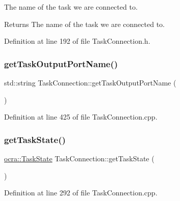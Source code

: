 The name of the task we are connected to.

\begin{DoxyReturn}{Returns}
The name of the task we are connected to. 
\end{DoxyReturn}


Definition at line 192 of file Task\+Connection.\+h.

\hypertarget{classocra__recipes_1_1TaskConnection_add06cf3474cdf145340850854c67ccd1}{}\label{classocra__recipes_1_1TaskConnection_add06cf3474cdf145340850854c67ccd1} 
\subsubsection{\texorpdfstring{get\+Task\+Output\+Port\+Name()}{getTaskOutputPortName()}}
{\footnotesize\ttfamily std\+::string Task\+Connection\+::get\+Task\+Output\+Port\+Name (\begin{DoxyParamCaption}{ }\end{DoxyParamCaption})}



Definition at line 425 of file Task\+Connection.\+cpp.

\hypertarget{classocra__recipes_1_1TaskConnection_ae85f5279d0fe6b8c63ee9736f6308583}{}\label{classocra__recipes_1_1TaskConnection_ae85f5279d0fe6b8c63ee9736f6308583} 
\subsubsection{\texorpdfstring{get\+Task\+State()}{getTaskState()}}
{\footnotesize\ttfamily \hyperlink{classocra_1_1TaskState}{ocra\+::\+Task\+State} Task\+Connection\+::get\+Task\+State (\begin{DoxyParamCaption}{ }\end{DoxyParamCaption})}



Definition at line 292 of file Task\+Connection.\+cpp.

\hypertarget{classocra__recipes_1_1TaskConnection_ac5a29440c295728f97b5a5f6df69924f}{}\label{classocra__recipes_1_1TaskConnection_ac5a29440c295728f97b5a5f6df69924f} 
